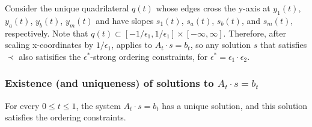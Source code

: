 \documentclass{patmorin}
\begin{document}
Consider the unique quadrilateral $q(t)$ whose edges cross the
y-axis at $y_1(t)$, $y_a(t)$, $y_b(t)$, $y_m(t)$ and have slopes
$s_1(t)$, $s_a(t)$, $s_b(t)$, and $s_m(t)$, respectively.  Note that
$q(t)\subset[-1/\epsilon_1,1/\epsilon_1]\times[-\infty,\infty]$.
Therefore, after scaling x-coordinates by $1/\epsilon_1$,
 applies to $A_t\cdot s =b_t$, so any solution $s$
that satisfies $\prec$ also satisifies the $\epsilon^*$-strong ordering
constraints, for $\epsilon^*=\epsilon_1\cdot\epsilon_2$.  

\subsubsection{Existence (and uniqueness) of solutions to $A_t\cdot s=b_t$}


\begin{lem}
   For every $0\le t\le 1$, the system $A_t\cdot s=b_t$ has a unique solution,
   and this solution satisfies the ordering constraints. %
\end{lem}
\end{document}
